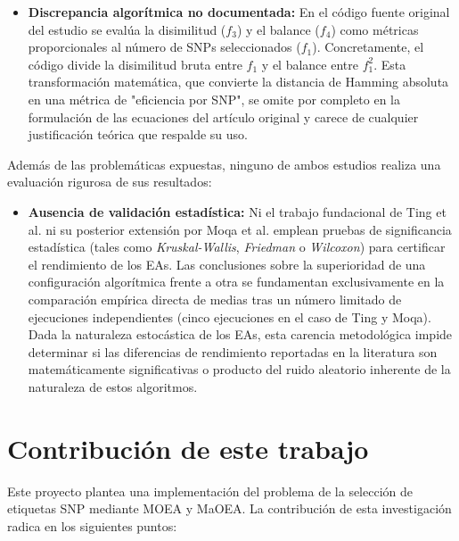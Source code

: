 \begin{itemize}
    \item \textbf{Discrepancia algorítmica no documentada:} En el código fuente original del estudio se evalúa la disimilitud ($f_3$) y el balance ($f_4$) como métricas proporcionales al número de SNPs seleccionados ($f_1$). Concretamente, el código divide la disimilitud bruta entre $f_1$ y el balance entre $f_1^2$. Esta transformación matemática, que convierte la distancia de Hamming absoluta en una métrica de "eficiencia por SNP", se omite por completo en la formulación de las ecuaciones del artículo original y carece de cualquier justificación teórica que respalde su uso.
\end{itemize}

Además de las problemáticas expuestas, ninguno de ambos estudios realiza una evaluación rigurosa de sus resultados:

\begin{itemize}
    \item \textbf{Ausencia de validación estadística:} Ni el trabajo fundacional de Ting et al. ni su posterior extensión por Moqa et al. emplean pruebas de significancia estadística (tales como \textit{Kruskal-Wallis}, \textit{Friedman} o \textit{Wilcoxon}) para certificar el rendimiento de los EAs. Las conclusiones sobre la superioridad de una configuración algorítmica frente a otra se fundamentan exclusivamente en la comparación empírica directa de medias tras un número limitado de ejecuciones independientes (cinco ejecuciones en el caso de Ting y Moqa). Dada la naturaleza estocástica de los EAs, esta carencia metodológica impide determinar si las diferencias de rendimiento reportadas en la literatura son matemáticamente significativas o producto del ruido aleatorio inherente de la naturaleza de estos algoritmos.
\end{itemize}

\section{Contribución de este trabajo}

Este proyecto plantea una implementación del problema de la selección de etiquetas SNP mediante MOEA y MaOEA. La contribución de esta investigación radica en los siguientes puntos:

